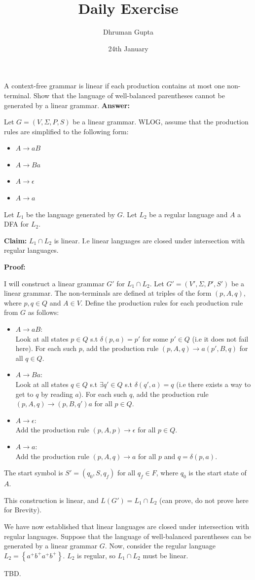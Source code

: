 \documentclass[11pt]{article}
\title{Daily Exercise}
\author{Dhruman Gupta}
\date{24th January}
\begin{document}

A context-free grammar is linear if each production contains at most one non-terminal. Show that the language of well-balanced parentheses cannot be generated by a linear grammar.
\textbf{Answer:}

Let $G = (V, \Sigma, P, S)$ be a linear grammar. WLOG, assume that the production rules are simplified to the following form:
\begin{itemize}
    \item $A \to aB$
    \item $A \to Ba$
    \item $A \to \epsilon$
    \item $A \to a$
\end{itemize}

Let $L_1$ be the language generated by $G$. Let $L_2$ be a regular language and $A$ a DFA for $L_2$.

\textbf{Claim:} $L_1 \cap L_2$ is linear. I.e linear languages are closed under intersection with regular languages.

\textbf{Proof:}

I will construct a linear grammar $G'$ for $L_1 \cap L_2$. Let $G' = (V', \Sigma, P', S')$ be a linear grammar. The non-terminals are defined at triples of the form $(p, A, q)$, where $p, q \in Q$ and $A \in V$. Define the production rules for each production rule from $G$ as follows:
\begin{itemize}
    \item $A \to aB$:\\
    Look at all states $p \in Q$ s.t $\delta(p, a) = p'$ for some $p' \in Q$ (i.e it does not fail here). For each such $p$, add the production rule $(p, A, q) \to a(p', B, q)$ for all $q \in Q$.

    \item $A \to Ba$:\\
    Look at all states $q \in Q$ s.t $\exists q' \in Q$ s.t $\delta(q', a) = q$ (i.e there exists a way to get to $q$ by reading $a$). For each such $q$, add the production rule $(p, A, q) \to (p, B, q')a$ for all $p \in Q$.

    \item $A \to \epsilon$:\\
    Add the production rule $(p, A, p) \to \epsilon$ for all $p \in Q$.

    \item $A \to a$:\\
    Add the production rule $(p, A, q) \to a$ for all $p$ and $q = \delta(p, a)$.
\end{itemize}

The start symbol is $S' = (q_0, S, q_f)$ for all $q_f \in F$, where $q_0$ is the start state of $A$.

This construction is linear, and $L(G') = L_1 \cap L_2$ (can prove, do not prove here for Brevity).

We have now established that linear languages are closed under intersection with regular languages. Suppose that the language of well-balanced parentheses can be generated by a linear grammar $G$. Now, consider the regular language $L_2 = \left\{ a^+b^+a^+b^+ \right\}$. $L_2$ is regular, so $L_1 \cap L_2$ must be linear.

TBD.
\end{document}
